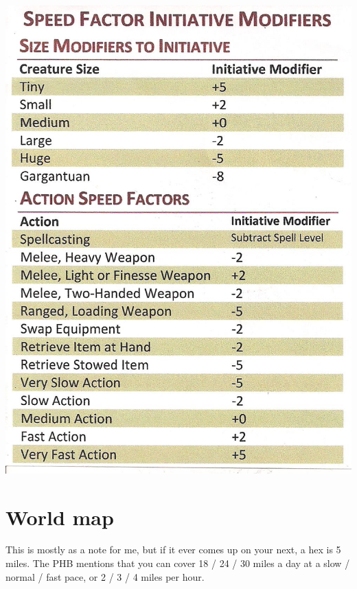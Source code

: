\includegraphics{img/speed-factor-initiative.jpeg}

\section{World map}
This is mostly as a note for me, but if it ever comes up on your next, a hex is 5 miles.
The PHB mentions that you can cover 18 / 24 / 30 miles a day at a slow / normal / fast pace,
  or 2 / 3 / 4 miles per hour.


